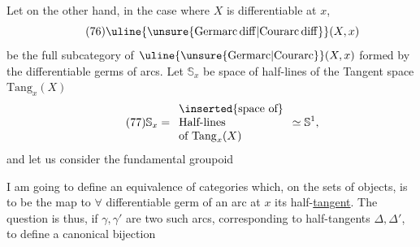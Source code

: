 
Let on the other hand, in the case where $X$ is differentiable at $x$, 
\[
\tag{76}
\uline{\unsure{\mathrm{Germarc\,diff}|\mathrm{Courarc\,diff}}}(X,x)
\]
be the full subcategory of  $\uline{\unsure{\mathrm{Germarc}|\mathrm{Courarc}}}(X,x)$ formed by the differentiable germs of arcs. Let $\mathbb S_x$  be space of half-lines of the Tangent space $\mathrm{Tang}_x(X)$
\[
\tag{77}
\mathbb S_x=
\begin{array}{l}
\inserted{\text{space of}}\\
\text{Half-lines}\\
\text{of }\mathrm{Tang}_x(X)
\end{array}
\simeq\mathbb S^1,
\]
and let us consider the fundamental groupoid

I am going to define an equivalence of categories
which, on the sets of objects, is to be the map  to $\forall$ differentiable germ of an arc at $x$ its half-\uline{tangent}. The question is thus, if $\gamma,\gamma'$ are two such arcs, corresponding to half-tangents $\Delta,\Delta'$, to define a canonical bijection




